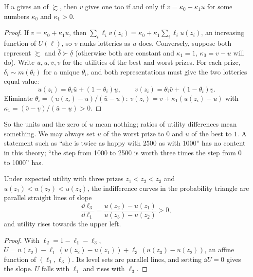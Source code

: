 \begin{proposition}\label{prop:b2:expected-utility:affine}
If $u$ gives an  of $\succsim$, then $v$ gives one too if and only if
$v = \kappa_0 + \kappa_1 u$ for some numbers $\kappa_0$ and $\kappa_1 > 0$.
\end{proposition}

\begin{proof}
If $v = \kappa_0 + \kappa_1 u$, then $\sum_i \ell_i v(z_i) = \kappa_0 + \kappa_1 \sum_i \ell_i u(z_i)$,
an increasing function of $U(\ell)$, so $v$ ranks lotteries as $u$ does. Conversely, suppose both
represent $\succsim$ and $\bar\delta \succ \underline\delta$ (otherwise both are constant and
$\kappa_1 = 1$, $\kappa_0 = v - u$ will do). Write $\bar u, \underline u, \bar v, \underline v$ for the
utilities of the best and worst prizes. For each prize, $\delta_i \sim m(\theta_i)$ for a unique
$\theta_i$, and both representations must give the two lotteries equal value:
\[
u(z_i) = \theta_i\bar u + (1-\theta_i)\underline u, \qquad v(z_i) = \theta_i\bar v +
(1-\theta_i)\underline v .
\]
Eliminate $\theta_i = (u(z_i) - \underline u)/(\bar u - \underline u)$: $v(z_i) = \underline v +
\kappa_1 (u(z_i) - \underline u)$ with $\kappa_1 = (\bar v - \underline v)/(\bar u - \underline u) >
0$.
\end{proof}

So the units and the zero of $u$ mean nothing; ratios of utility differences mean something. We may
always set $u$ of the worst prize to $0$ and $u$ of the best to $1$. A statement such as ``she is
twice as happy with \num{2500} as with \num{1000}'' has no content in this theory; ``the step from
\num{1000} to \num{2500} is worth three times the step from $0$ to \num{1000}'' has.

\begin{proposition}\label{prop:b2:expected-utility:parallel}
Under expected utility with three prizes $z_1 < z_2 < z_3$ and $u(z_1) < u(z_2) < u(z_3)$, the
indifference curves in the probability triangle are parallel straight lines of slope
\[
\frac{\dd\ell_3}{\dd\ell_1} = \frac{u(z_2) - u(z_1)}{u(z_3) - u(z_2)} > 0,
\]
and utility rises towards the upper left.
\end{proposition}

\begin{proof}
With $\ell_2 = 1 - \ell_1 - \ell_3$, $U = u(z_2) - \ell_1\,(u(z_2) - u(z_1)) + \ell_3\,(u(z_3) -
u(z_2))$, an affine function of $(\ell_1, \ell_3)$. Its level sets are parallel lines, and setting
$\dd U = 0$ gives the slope. $U$ falls with $\ell_1$ and rises with $\ell_3$.
\end{proof}

